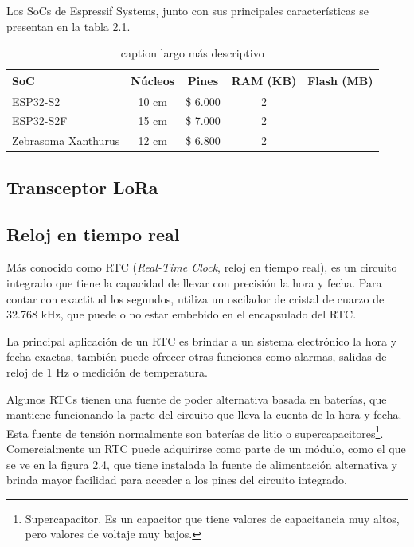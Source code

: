 Los SoCs de Espressif Systems, junto con sus principales características se presentan en la tabla 2.1.

\begin{table}[h]
	\centering
	\caption[caption corto]{caption largo más descriptivo}
	\begin{tabular}{l c c c c}    
		\toprule
		\textbf{SoC} & \textbf{Núcleos} & \textbf{Pines} & \textbf{RAM (KB)} & \textbf{Flash (MB)} \\
		\midrule
		ESP32-S2 & 10 cm & \$ 6.000 & 2 \\		
		ESP32-S2F	 & 15 cm & \$ 7.000 & 2 \\
		Zebrasoma Xanthurus	 & 12 cm & \$ 6.800 & 2 \\
		\bottomrule
		\hline
	\end{tabular}
	\label{tab:peces}
\end{table}

\subsection{Transceptor LoRa}



\subsection{Reloj en tiempo real}

Más conocido como RTC (\textit{Real-Time Clock}, reloj en tiempo real), es un circuito integrado que tiene la capacidad de llevar con precisión la hora y fecha. Para contar con exactitud los segundos, utiliza un oscilador de cristal de cuarzo de 32.768 kHz, que puede o no estar embebido en el encapsulado del RTC.

La principal aplicación de un RTC es brindar a un sistema electrónico la hora y fecha exactas,  también puede ofrecer otras funciones como alarmas, salidas de reloj de 1 Hz o medición de temperatura.

Algunos RTCs tienen una fuente de poder alternativa basada en baterías, que mantiene funcionando la parte del circuito que lleva la cuenta de la hora y fecha. Esta fuente de tensión normalmente son baterías de litio o supercapacitores\footnote{Supercapacitor. Es un capacitor que tiene valores de capacitancia muy altos, pero valores de voltaje muy bajos.}. Comercialmente un RTC puede adquirirse como parte de un módulo, como el que se ve en la figura 2.4, que tiene instalada la fuente de alimentación alternativa y brinda mayor facilidad para acceder a los pines del circuito integrado.

